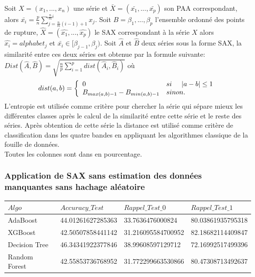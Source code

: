 \documentclass[french]{report}
\begin{document}
Soit $X = (x_1, ..., x_n)$ une série et $\bar{X} = (\bar{x_1}, ..., \bar{x_p})$ son PAA correspondant, alors $\bar{x_i} = \frac{p}{n} \sum \limits_{j=\frac{n}{m}(i-1)+1}^{\frac{n}{m}i} x_j$.
Soit $B = {\beta_1, ..., \beta_p}$ l'ensemble ordonné des points de rupture, $\widehat{X} = (\widehat{x_1}, ..., \widehat{x_p})$ le SAX correspondant à la série $X$ alors $\widehat{x_i} = alphabet_j $ et $\bar{x_i} \in [\beta_{j-1}, \beta_j)$.
Soit $\widehat{A}$ et $\widehat{B}$ deux séries sous la forme SAX, la similarité entre ces deux séries est obtenue par la formule suivante:\\
$Dist(\widehat{A}, \widehat{B}) = \sqrt{\frac{n}{p} \sum \limits_{i = 1}^p dist(\widehat{A}_i, \widehat{B}_i)}$  \hspace{2cm} où  \hspace{1cm}
$$dist(a, b) = \left \{ \begin{array}{ll} 0 & si \hspace{0.5cm} |a-b|\leq 1 \\ B_{max(a, b)-1} - B_{min(a, b)-1} & sinon. \end{array}\right.$$
L'entropie est utilisée comme critère pour chercher la série qui sépare mieux les différentes classes après le calcul de la similarité entre cette série et le reste des séries. Après obtention de cette série la distance est utilisé comme critère de classification dans les quatre bandes en appliquant les algorithmes classique de la fouille de données.\\

Toutes les colonnes sont dans en pourcentage.

\subsubsection*{Application de SAX sans estimation des données manquantes sans hachage aléatoire}

\begin{table}[H]
	\begin{tabular} {|l|l|l|l|}%
		\hline	
		$Algo$ & $Accuracy\_Test$ & $Rappel\_Test\_0 $ & $Rappel\_Test\_1$\\
		\hline
		AdaBoost & 44.01261627285363 & 33.7636476000824 & 80.03861935795318 \\
		\hline
		XGBoost & 42.50507858441142 & 31.216095584700952 & 82.18682114409847  \\
		\hline
		Decision Tree & 46.34341922377846 & 38.99608597129712 & 72.16992517499396 \\ 
		\hline
		Random Forest & 42.55853736768952 & 31.772299663530866 & 80.47308713492637 \\
		\hline			
	\end{tabular}
\end{table}
\end{document}

